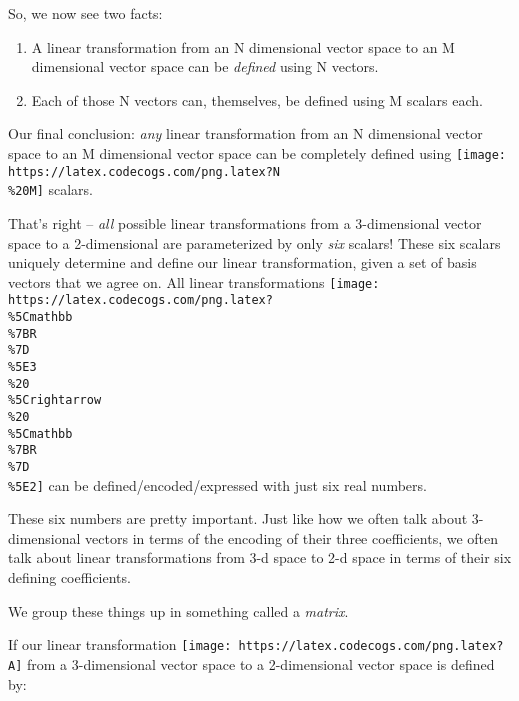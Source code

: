 \documentclass[]{article}
\begin{document}
So, we now see two facts:

\begin{enumerate}
\def\labelenumi{\arabic{enumi}.}
\tightlist
\item
  A linear transformation from an N dimensional vector space to an M dimensional
  vector space can be \emph{defined} using N vectors.
\item
  Each of those N vectors can, themselves, be defined using M scalars each.
\end{enumerate}

Our final conclusion: \emph{any} linear transformation from an N dimensional
vector space to an M dimensional vector space can be completely defined using
\texttt{[image: https://latex.codecogs.com/png.latex?N\\\%20M]} scalars.

That's right -- \emph{all} possible linear transformations from a 3-dimensional
vector space to a 2-dimensional are parameterized by only \emph{six} scalars!
These six scalars uniquely determine and define our linear transformation, given
a set of basis vectors that we agree on. All linear transformations
\texttt{[image: https://latex.codecogs.com/png.latex?\\\%5Cmathbb\\\%7BR\\\%7D\\\%5E3\\\%20\\\%5Crightarrow\\\%20\\\%5Cmathbb\\\%7BR\\\%7D\\\%5E2]}
can be defined/encoded/expressed with just six real numbers.

These six numbers are pretty important. Just like how we often talk about
3-dimensional vectors in terms of the encoding of their three coefficients, we
often talk about linear transformations from 3-d space to 2-d space in terms of
their six defining coefficients.

We group these things up in something called a \emph{matrix}.

If our linear transformation
\texttt{[image: https://latex.codecogs.com/png.latex?A]} from a 3-dimensional
vector space to a 2-dimensional vector space is defined by:
\end{document}
